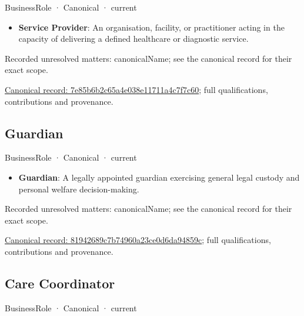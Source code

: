 \label{element:7e85b6b2c65a4e038e11711a4c7f7c60}
{\small BusinessRole · Canonical · current}\par

\begin{itemize}


\item \textbf{Service Provider}: An organisation, facility, or practitioner acting in the capacity of delivering a defined healthcare or diagnostic service.

\end{itemize}

{\small Recorded unresolved matters: canonicalName; see the canonical record for their exact scope.}\par
{\footnotesize \href{../../../../continuum/business/business-role/7e85b6b2c65a4e038e11711a4c7f7c60.md}{Canonical record: 7e85b6b2c65a4e038e11711a4c7f7c60}; full qualifications, contributions and provenance.}\par
\subsection{Guardian}

\label{element:81942689c7b74960a23ce0d6da94859c}
{\small BusinessRole · Canonical · current}\par

\begin{itemize}


\item \textbf{Guardian}: A legally appointed guardian exercising general legal custody and personal welfare decision-making.

\end{itemize}

{\small Recorded unresolved matters: canonicalName; see the canonical record for their exact scope.}\par
{\footnotesize \href{../../../../continuum/business/business-role/81942689c7b74960a23ce0d6da94859c.md}{Canonical record: 81942689c7b74960a23ce0d6da94859c}; full qualifications, contributions and provenance.}\par
\subsection{Care Coordinator}

\label{element:84cf0b0868b94a1ea5ce5791fcfa66f9}
{\small BusinessRole · Canonical · current}\par


